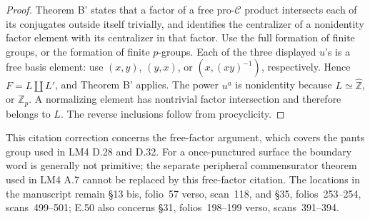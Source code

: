 \begin{proof}
Theorem B' states that a factor of a free
pro-\(\mathcal C\) product intersects each of
its conjugates outside itself trivially, and
identifies the centralizer of a nonidentity
factor element with its centralizer in that
factor. Use the full formation of finite
groups, or the formation of finite \(p\)-groups.
Each of the three displayed \(u\)'s is a free
basis element: use \((x,y)\), \((y,x)\), or
\((x,(xy)^{-1})\), respectively. Hence
\(F=L\amalg L'\), and Theorem B' applies.
The power \(u^a\) is nonidentity because
\(L\simeq\widehat{\mathbb Z}\), or
\(\mathbb Z_p\). A normalizing element has
nontrivial factor intersection and therefore
belongs to \(L\). The reverse inclusions
follow from procyclicity.
\end{proof}

This citation correction concerns the free-factor
argument, which covers the pants group used in
LM4 D.28 and D.32. For a once-punctured surface
the boundary word is generally not primitive;
the separate peripheral commensurator theorem
used in LM4 A.7 cannot be replaced by this
free-factor citation. The locations in the
manuscript remain \S13 bis, folio~57 verso,
scan~118, and \S35, folios~253--254,
scans~499--501; E.50 also concerns \S31,
folios~198--199 verso, scans~391--394.

